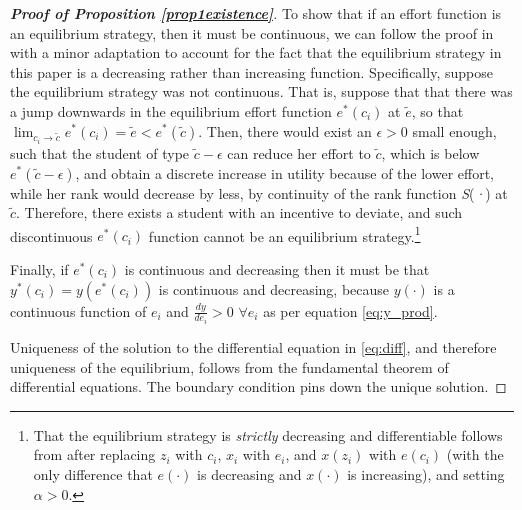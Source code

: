\begin{proof}[{\bf Proof of Proposition \ref{prop1existence}}]
To show that if an effort function is an equilibrium strategy, then it must be continuous, we can follow the proof in \cite{hopkins2004running} with a minor adaptation to account for the fact that the equilibrium strategy in this paper is a decreasing rather than increasing function. Specifically, suppose the equilibrium strategy was not continuous. That is, suppose that that there was a jump downwards in the
equilibrium effort function $e^{*}(c_i)$ at $\tilde{e}$, so that $\lim_{c_i\to \tilde{c}}e^{*}(c_i)=\tilde{e}<e^{*}(\tilde{c})$. Then, there would exist an $\epsilon>0$ small enough, such that the student
of type $\tilde{c}-\epsilon$ can reduce her effort to
$\tilde{c}$, which is below $e^{*}(\tilde{c}-\epsilon)$, and obtain a discrete
increase in utility because of the lower effort, while her rank would decrease
by less, by continuity of the rank function \textit{S}(\textit{·}) at $\tilde{c}$. Therefore, there exists a student with an incentive to deviate,
and such discontinuous $e^{*}(c_i)$ function cannot be an equilibrium
strategy.\footnote{That the equilibrium strategy is {\itshape strictly} decreasing and differentiable follows from \cite{hopkins2004running} after replacing $z_i$ with $c_i$, $x_i$ with $e_i$, and $x(z_i)$ with $e(c_i)$ (with the only difference that $e(\cdot)$ is decreasing and $x(\cdot)$ is increasing), and setting $\alpha>0$. }\par 

Finally, if $e^{*}(c_i)$ is continuous and decreasing then it must be that $y^{*}(c_i)=y(e^{*}(c_i))$ is continuous and decreasing, because $y(\cdot)$ is a continuous function of $e_i$ and $\frac {d y}{d e_i}>0$ $\forall e_i$ as per equation \eqref{eq:y_prod}.\par 

Uniqueness of the solution to the differential equation in \eqref{eq:diff}, and therefore uniqueness of the
equilibrium, follows from the fundamental theorem of differential equations.
The boundary condition pins down the unique solution.\par 


\end{proof}





